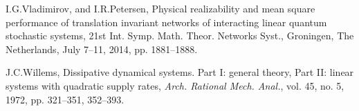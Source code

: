 \documentclass[letterpaper, 10pt, conference]{ieeeconf}  %
\begin{document}
\begin{thebibliography}{99}
%

I.G.Vladimirov, and I.R.Petersen,
Physical realizability and mean square performance of translation
invariant networks of interacting linear quantum stochastic systems,
21st
Int. Symp. Math. Theor. Networks Syst.,
Groningen, The Netherlands,
July 7--11, 2014,
pp.  1881--1888.

J.C.Willems, Dissipative dynamical systems. Part I: general
theory, Part II: linear
systems with quadratic supply rates, \emph{Arch. Rational Mech. Anal.}, vol. 45, no. 5, 1972, pp.
321--351, 352--393.


\end{thebibliography}
\end{document}
